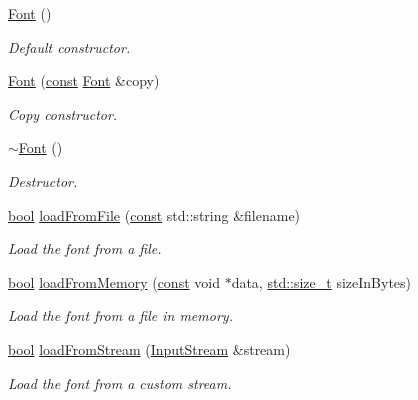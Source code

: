 \begin{DoxyCompactItemize}
\hyperlink{classsf_1_1_font_a506404655b8869ed60d1e7709812f583}{Font} ()
\begin{DoxyCompactList}\small\item\em Default constructor. \end{DoxyCompactList}\item 
\hyperlink{classsf_1_1_font_a72d7322b355ee2f1be4500f530e98081}{Font} (\hyperlink{term__entry_8h_a57bd63ce7f9a353488880e3de6692d5a}{const} \hyperlink{classsf_1_1_font}{Font} \&copy)
\begin{DoxyCompactList}\small\item\em Copy constructor. \end{DoxyCompactList}\item 
\hyperlink{classsf_1_1_font_aa18a3c62e6e01e9a21c531b5cad4b7f2}{$\sim$\-Font} ()
\begin{DoxyCompactList}\small\item\em Destructor. \end{DoxyCompactList}\item 
\hyperlink{term__entry_8h_a002004ba5d663f149f6c38064926abac}{bool} \hyperlink{classsf_1_1_font_ab020052ef4e01f6c749a85571c0f3fd1}{load\-From\-File} (\hyperlink{term__entry_8h_a57bd63ce7f9a353488880e3de6692d5a}{const} std\-::string \&filename)
\begin{DoxyCompactList}\small\item\em Load the font from a file. \end{DoxyCompactList}\item 
\hyperlink{term__entry_8h_a002004ba5d663f149f6c38064926abac}{bool} \hyperlink{classsf_1_1_font_abf2f8d6de31eb4e1db02e061c323e346}{load\-From\-Memory} (\hyperlink{term__entry_8h_a57bd63ce7f9a353488880e3de6692d5a}{const} void $\ast$data, \hyperlink{nc__alloc_8h_a7b60c5629e55e8ec87a4547dd4abced4}{std\-::size\-\_\-t} size\-In\-Bytes)
\begin{DoxyCompactList}\small\item\em Load the font from a file in memory. \end{DoxyCompactList}\item 
\hyperlink{term__entry_8h_a002004ba5d663f149f6c38064926abac}{bool} \hyperlink{classsf_1_1_font_abc3f37a354ce8b9a21f8eb93bd9fdafb}{load\-From\-Stream} (\hyperlink{classsf_1_1_input_stream}{Input\-Stream} \&stream)
\begin{DoxyCompactList}\small\item\em Load the font from a custom stream. \end{DoxyCompactList}\item 

\end{DoxyCompactItemize}
